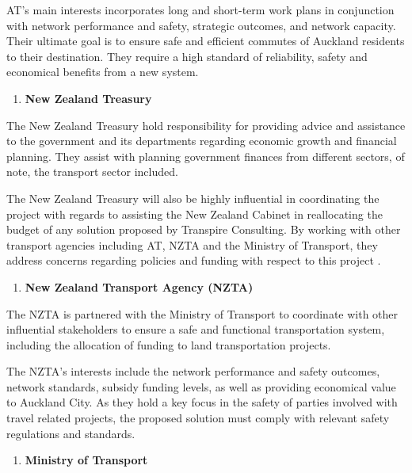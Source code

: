 \documentclass[twoside, a4paper, 11pt]{article}
\begin{document}
AT's main interests incorporates long and short-term work plans in conjunction with network performance and safety, strategic outcomes, and network capacity. Their ultimate goal is to ensure safe and efficient commutes of Auckland residents to their destination. They require a high standard of reliability, safety and economical benefits from a new system.


\begin{enumerate}[label=\textbf{\arabic*}),leftmargin=0in,resume]
\item \textbf{New Zealand Treasury}
\end{enumerate}

The New Zealand Treasury hold responsibility for providing advice and assistance to the government and its departments regarding economic growth and financial planning. They assist with planning government finances from different sectors, of note, the transport sector included. 

The New Zealand Treasury will also be highly influential in coordinating the project with regards to assisting the New Zealand Cabinet in reallocating the budget of any solution proposed by Transpire Consulting. By working with other transport agencies including AT, NZTA and the Ministry of Transport, they address concerns regarding policies and funding with respect to this project \citep{treasury16_2}.

\begin{enumerate}[label=\textbf{\arabic*}),leftmargin=0in,resume]
\item \textbf{New Zealand Transport Agency (NZTA)}
\end{enumerate}

The NZTA is partnered with the Ministry of Transport to coordinate with other influential stakeholders \citep{nztaND} to ensure a safe and functional transportation system, including the allocation of funding to land transportation projects. 

The NZTA's interests include the network performance and safety outcomes, network standards, subsidy funding levels, as well as providing economical value to Auckland City. As they hold a key focus in the safety of parties involved with travel related projects, the proposed solution must comply with relevant safety regulations and standards.

\begin{enumerate}[label=\textbf{\arabic*}),leftmargin=0in,resume]
\item \textbf{Ministry of Transport}
\end{enumerate}
\end{document}
